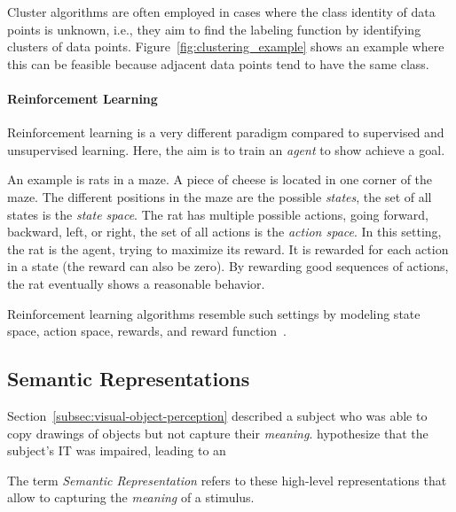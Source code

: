 Cluster algorithms are often employed in cases where the class identity of data points is unknown, i.e., they aim to find the labeling function by identifying clusters of data points.
Figure~\ref{fig:clustering_example} shows an example where this can be feasible because adjacent data points tend to have the same class.

\paragraph{Reinforcement Learning}
Reinforcement learning is a very different paradigm compared to supervised and unsupervised learning.
Here, the aim is to train an \textit{agent} to show achieve a goal.

An example is rats in a maze.
A piece of cheese is located in one corner of the maze.
The different positions in the maze are the possible \textit{states}, the set of all states is the \textit{state space}.
The rat has multiple possible actions, going forward, backward, left, or right, the set of all actions is the \textit{action space}.
In this setting, the rat is the agent, trying to maximize its reward.
It is rewarded for each action in a state (the reward can also be zero).
By rewarding good sequences of actions, the rat eventually shows a reasonable behavior.

Reinforcement learning algorithms resemble such settings by modeling state space, action space, rewards, and reward function~\citep[pp. 1, ff.]{sutton2018reinforcement}.

\subsection{Semantic Representations}\label{subsec:semantic-representations}

Section~\ref{subsec:visual-object-perception} described a subject who was able to copy drawings of objects but not capture their \textit{meaning}.
\citet[pp. 1069, 1070]{squire2012fundamental} hypothesize that the subject's \ac{IT} was impaired, leading to an 

The term \textit{Semantic Representation} refers to these high-level representations that allow to capturing the \textit{meaning} of a stimulus.

